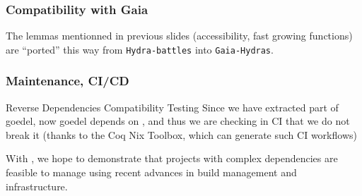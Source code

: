 \documentclass[10pt, fleqn]{beamer}
\begin{document}

\begin{frame}
  \frametitle{Compatibility with Gaia}
  \begin{block}{}
    {\footnotesize
      }
    
  \end{block}
  The lemmas mentionned in previous slides (accessibility, fast growing functions) are ``ported'' this way from \texttt{Hydra-battles}   into \texttt{Gaia-Hydras}.
\end{frame}

\begin{frame}
  \frametitle{Maintenance, CI/CD}
 

  \begin{block}{Reverse Dependencies Compatibility Testing}
    Since we have extracted part of {\color{plugincolor}goedel}, now {\color{plugincolor}goedel} depends on {\color{plugincolor}\Hydras}, and thus we are checking in CI that we do not break it (thanks to the \textcolor{lookcolor}{Coq Nix Toolbox},
    which can generate such CI workflows)
  \end{block}

  \begin{block}{}
    With \Hydras, we hope to demonstrate that projects with complex dependencies are feasible to manage using recent advances in build management and infrastructure.
  \end{block}

\end{frame}

\end{document}
